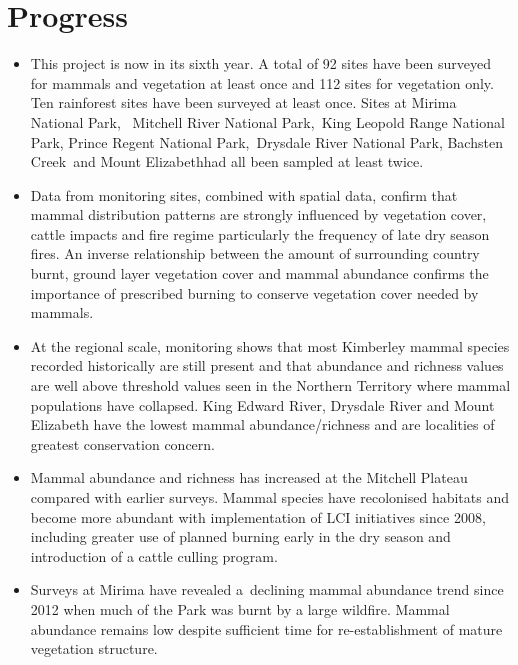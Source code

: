 \documentclass[version=last,
    paper=a4, %
    10pt, %
    usenames,
    dvipsnames,
    oneside, %
    headings=openany, %
    DIV=15 %
]{scrbook}
\begin{document}
\section*{Progress}
\begin{itemize}
\itemsep1pt\parskip0pt
\item
  This project is now in its sixth year. A total of 92 sites have been
  surveyed for mammals and vegetation at least once and 112 sites for
  vegetation only. Ten rainforest sites have been surveyed at least
  once. Sites at Mirima National Park, ~Mitchell River National
  Park,~King Leopold Range National Park, Prince Regent National
  Park,~Drysdale River National Park, Bachsten Creek~and Mount
  Elizabethhad all been sampled at least twice.
\item
  Data from monitoring sites, combined with spatial data, confirm that
  mammal distribution patterns are strongly influenced by vegetation
  cover, cattle impacts and fire regime particularly the frequency of
  late dry season fires. An inverse relationship between the amount of
  surrounding country burnt, ground layer vegetation cover and mammal
  abundance confirms the importance of prescribed burning to conserve
  vegetation cover needed by mammals.~
\item
  At the regional scale, monitoring shows that most Kimberley mammal
  species recorded historically are still present and that abundance and
  richness values are well above threshold values seen in the Northern
  Territory where mammal populations have collapsed. King Edward River,
  Drysdale River and Mount Elizabeth have the lowest mammal
  abundance/richness and are localities of greatest conservation
  concern.
\item
  Mammal abundance and richness has increased at the Mitchell Plateau
  compared with earlier surveys. Mammal species have recolonised
  habitats and become more abundant with implementation of LCI
  initiatives since 2008, including greater use of planned burning early
  in the dry season and introduction of a cattle culling program.
\item
  Surveys at Mirima have revealed a~declining mammal abundance trend
  since 2012 when much of the Park was burnt by a large wildfire. Mammal
  abundance remains low despite sufficient time for re-establishment of
  mature vegetation structure.
\end{itemize}
\end{document}
